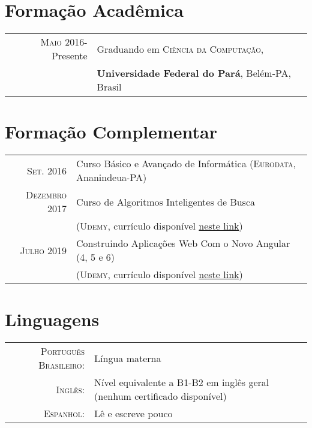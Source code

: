 \documentclass[a4paper,10pt]{article}
\begin{document}
\section{Formação Acadêmica}
\begin{tabular}{rl}	
 \textsc{Maio} 2016-Presente & Graduando em \textsc{Ciência da Computação}, \\
& \textbf{Universidade Federal do Pará}, Belém-PA, Brasil
\end{tabular}

\section{Formação Complementar}
\begin{tabular}{rl}
 \textsc{Set.} 2016 & Curso Básico e Avançado de Informática (\textsc{Eurodata}, Ananindeua-PA)\\
\textsc{Dezembro} 2017 & Curso de Algoritmos Inteligentes de Busca\\ & (\textsc{Udemy}, \footnotesize{currículo disponível \href{https://www.udemy.com/certificate/UC-9414I0UR/}{neste link}})\\
\textsc{Julho} 2019 &  Construindo Aplicações Web Com o Novo Angular (4, 5 e 6)\\ & (\textsc{Udemy}, \footnotesize{currículo disponível \href{https://www.udemy.com/certificate/UC-P6VGWTET/}{neste link}})
\end{tabular}

\section{Linguagens}
\begin{tabular}{rl}
 \textsc{Português Brasileiro:} & Língua materna \\
\textsc{Inglês:} & Nível equivalente a B1-B2 em inglês geral (nenhum certificado disponível)\\
\textsc{Espanhol:} & Lê e escreve pouco \\
\end{tabular}
\end{document}
